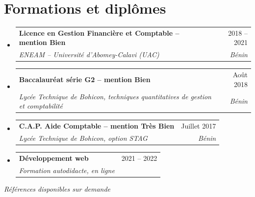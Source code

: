\documentclass[a4paper,11pt]{article}
\makeatletter
\newlength{\entrygap}
\newlength{\headgap}
\newcommand{\resumeSubheading}[4]{
    \vspace{\entrygap}\item
    \begin{tabular*}{0.97\textwidth}[t]{l@{\extracolsep{\fill}}r}
        \textbf{#1} & #2 \\
        \textit{\small#3} & \textit{\small #4} \\
    \end{tabular*}\vspace{\headgap}
}
\newcommand{\resumeSubHeadingListStart}{\begin{itemize}[leftmargin=0.15in, label={}]}
\newcommand{\resumeSubHeadingListEnd}{\end{itemize}}
\makeatother
\begin{document}
\section{Formations et diplômes}
\resumeSubHeadingListStart

    \resumeSubheading
        {Licence en Gestion Financière et Comptable -- mention Bien}{2018 -- 2021}
        {ENEAM -- Université d'Abomey-Calavi (UAC)}{Bénin}

    \resumeSubheading
        {Baccalauréat série G2 -- mention Bien}{Août 2018}
        {Lycée Technique de Bohicon, techniques quantitatives de gestion et comptabilité}{Bénin}

    \resumeSubheading
        {C.A.P. Aide Comptable -- mention Très Bien}{Juillet 2017}
        {Lycée Technique de Bohicon, option STAG}{Bénin}

    \resumeSubheading
        {Développement web}{2021 -- 2022}
        {Formation autodidacte, en ligne}{}

\resumeSubHeadingListEnd

\vspace{6pt}
\begin{center}
    \small\textit{Références disponibles sur demande}
\end{center}

\end{document}
